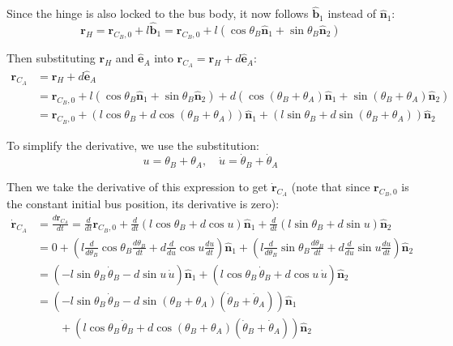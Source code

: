 \documentclass[titlepage]{article}
\begin{document}
Since the hinge is also locked to the bus body, it now follows $\hat{\boldsymbol{b}}_1$ instead of $\hat{\boldsymbol{n}}_1$:
\begin{equation}
	\boldsymbol{r}_H=\boldsymbol{r}_{C_B,0}+l\hat{\boldsymbol{b}}_1=\boldsymbol{r}_{C_B,0}+l\left(\cos\theta_B\hat{\boldsymbol{n}}_1+\sin\theta_B\hat{\boldsymbol{n}}_2\right)
\end{equation}

Then substituting $\boldsymbol{r}_H$ and $\hat{\boldsymbol{e}}_A$ into $\boldsymbol{r}_{C_A}=\boldsymbol{r}_H+d\hat{\boldsymbol{e}}_A$:
\begin{equation}
	\begin{split}
		\boldsymbol{r}_{C_A}&=\boldsymbol{r}_H+d\hat{\boldsymbol{e}}_A \\
		&=\boldsymbol{r}_{C_B,0}+l\left(\cos\theta_B\hat{\boldsymbol{n}}_1+\sin\theta_B\hat{\boldsymbol{n}}_2\right)+d\left(\cos(\theta_B+\theta_A)\hat{\boldsymbol{n}}_1+\sin(\theta_B+\theta_A)\hat{\boldsymbol{n}}_2\right) \\
		&=\boldsymbol{r}_{C_B,0}+\left(l\cos\theta_B+d\cos(\theta_B+\theta_A)\right)\hat{\boldsymbol{n}}_1+\left(l\sin\theta_B+d\sin(\theta_B+\theta_A)\right)\hat{\boldsymbol{n}}_2
	\end{split}
\end{equation}

To simplify the derivative, we use the substitution:
\begin{equation}
	u=\theta_B+\theta_A,\quad\dot{u}=\dot{\theta}_B+\dot{\theta}_A
\end{equation}

Then we take the derivative of this expression to get $\dot{\boldsymbol{r}}_{C_A}$ (note that since $\boldsymbol{r}_{C_B,0}$ is the constant initial bus position, its derivative is zero):
\begin{equation}
	\begin{split}
		\dot{\boldsymbol{r}}_{C_A}&=\frac{d\boldsymbol{r}_{C_A}}{dt}=\frac{d}{dt}\boldsymbol{r}_{C_B,0}+\frac{d}{dt}\left(l\cos\theta_B+d\cos u\right)\hat{\boldsymbol{n}}_1+\frac{d}{dt}\left(l\sin\theta_B+d\sin u\right)\hat{\boldsymbol{n}}_2 \\
		&=0+\left(l\frac{d}{d\theta_B}\cos\theta_B\frac{d\theta_B}{dt}+d\frac{d}{du}\cos u\frac{du}{dt}\right)\hat{\boldsymbol{n}}_1+\left(l\frac{d}{d\theta_B}\sin\theta_B\frac{d\theta_B}{dt}+d\frac{d}{du}\sin u\frac{du}{dt}\right)\hat{\boldsymbol{n}}_2 \\
		&=\left(-l\sin\theta_B\,\dot{\theta}_B-d\sin u\,\dot{u}\right)\hat{\boldsymbol{n}}_1+\left(l\cos\theta_B\,\dot{\theta}_B+d\cos u\,\dot{u}\right)\hat{\boldsymbol{n}}_2 \\
		&=\left(-l\sin\theta_B\,\dot{\theta}_B-d\sin(\theta_B+\theta_A)\left(\dot{\theta}_B+\dot{\theta}_A\right)\right)\hat{\boldsymbol{n}}_1 \\
		&\qquad+\left(l\cos\theta_B\,\dot{\theta}_B+d\cos(\theta_B+\theta_A)\left(\dot{\theta}_B+\dot{\theta}_A\right)\right)\hat{\boldsymbol{n}}_2
	\end{split}
\end{equation}
\end{document}
